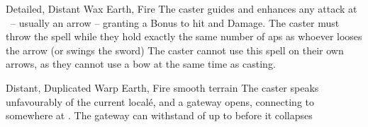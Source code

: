 \ifodd\value{diceNo}

  {Detailed, Distant}%
  {Wax}%
  {Earth, Fire}%
  {}%
  {The caster guides and enhances any attack at \spellRange\ -- usually an arrow -- granting a  Bonus to hit and Damage.
    The caster must throw the spell while they hold exactly the same number of \glspl{ap} as whoever looses the arrow (or swings the sword)}%
  {The caster cannot use this spell on their own arrows, as they cannot use a bow at the same time as casting.}

\else

  {Distant, Duplicated}%
  {Warp}%
  {Earth, Fire}%
  {smooth terrain}%
  {The caster speaks unfavourably of the current local\'e, and a gateway opens, connecting to somewhere at \spellRange.
  The gateway can withstand  of up to  before it collapses}%
  {}

\fi

